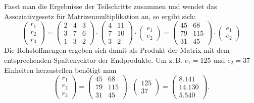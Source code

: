 Fasst man die Ergebnisse der Teilschritte zusammen und wendet das Assoziativgesetz für Matrizenmultiplikation an, so ergibt sich:
\[ \begin{pmatrix} r_1 \\ r_2 \\ r_3 \end{pmatrix} = \begin{pmatrix} 2 & 4 & 3 \\ 3 & 7 & 6 \\ 1 & 3 & 2 \end{pmatrix} \cdot \begin{pmatrix} 4 & 11 \\ 7 & 10 \\ 3 & 2 \end{pmatrix} \cdot \begin{pmatrix} e_1 \\ e_2 \end{pmatrix} = \begin{pmatrix} 45 & 68 \\ 79 & 115 \\ 31 & 45 \end{pmatrix} \cdot \begin{pmatrix} e_1 \\ e_2 \end{pmatrix} \]
Die Rohstoffmengen ergeben sich damit als Produkt der Matrix mit dem entsprechenden Spaltenvektor der Endprodukte.
Um z.\,B. $e_1 = 125$ und $e_2 = 37$ Einheiten herzustellen benötigt man
\[ \begin{pmatrix} r_1 \\ r_2 \\ r_3 \end{pmatrix} = \begin{pmatrix} 45 & 68 \\ 79 & 115 \\ 31 & 45 \end{pmatrix} \cdot \begin{pmatrix} 125 \\ 37 \end{pmatrix} = \begin{pmatrix} 8.141 \\ 14.130 \\ 5.540 \end{pmatrix} . \]
